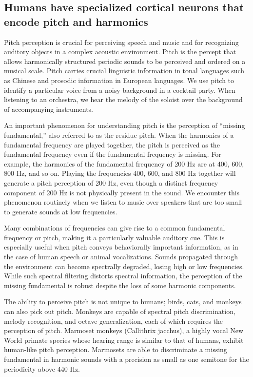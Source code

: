 \documentclass[journal]{IEEEtran}
\begin{document}
\subsection{Humans have specialized cortical neurons that encode pitch and harmonics}
Pitch perception is crucial for perceiving speech and music and for recognizing auditory objects in a complex acoustic environment.
Pitch is the percept that allows harmonically structured periodic sounds to be perceived and ordered on a musical scale.
Pitch carries crucial linguistic information in tonal languages such as Chinese and prosodic information in European languages.
We use pitch to identify a particular voice from a noisy background in a cocktail party.
When listening to an orchestra, we hear the melody of the soloist over the background of accompanying instruments.


An important phenomenon for understanding pitch is the perception of “missing fundamental,” also referred to as the residue pitch.
When the harmonics of a fundamental frequency are played together, the pitch is perceived as the fundamental frequency even if the fundamental frequency is missing.
For example, the harmonics of the fundamental frequency of 200 Hz are at 400, 600, 800 Hz, and so on.
Playing the frequencies 400, 600, and 800 Hz together will generate a pitch perception of 200 Hz, even though a distinct frequency component of 200 Hz is not physically present in the sound.
We encounter this phenomenon routinely when we listen to music over speakers that are too small to generate sounds at low frequencies.


Many combinations of frequencies can give rise to a common fundamental frequency or pitch, making it a particularly valuable auditory cue.
This is especially useful when pitch conveys behaviorally important information, as in the case of human speech or animal vocalizations.
Sounds propagated through the environment can become spectrally degraded, losing high or low frequencies.
While such spectral filtering distorts spectral information, the perception of the missing fundamental is robust despite the loss of some harmonic components.


The ability to perceive pitch is not unique to humans; 
birds, cats, and monkeys can also pick out pitch.
Monkeys are capable of spectral pitch discrimination, melody recognition, and octave generalization, each of which requires the perception of pitch.
Marmoset monkeys (Callithrix jacchus), a highly vocal New World primate species whose hearing range is similar to that of humans, exhibit human-like pitch perception.
Marmosets are able to discriminate a missing fundamental in harmonic sounds with a precision as small as one semitone for the periodicity above 440 Hz.
\end{document}

